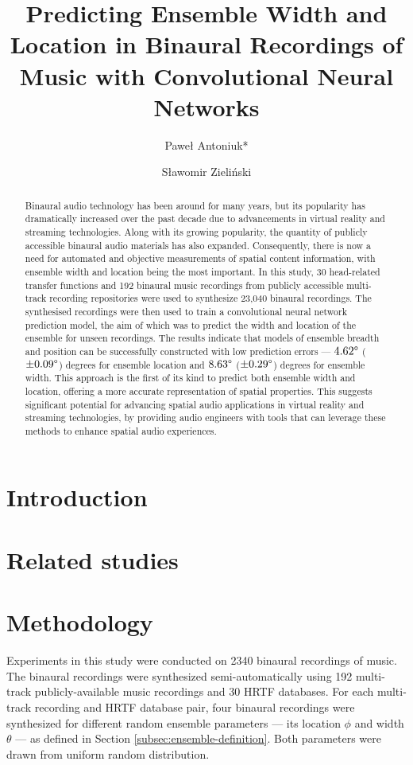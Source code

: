 \documentclass{article}
\title{Predicting Ensemble Width and Location in Binaural Recordings of Music with Convolutional Neural Networks}
\author[1]{Paweł Antoniuk*}
\author[1]{Sławomir Zieliński}
\affil[1]{Faculty of Computer Science, Białystok University of Technology, 15-351 Białystok, Poland; pawel.antoniuk@sd.pb.edu.pl}
\affil[*]{Corresponding author: pawel.antoniuk@sd.pb.edu.pl}
\date{}
\begin{document}
\maketitle

\begin{abstract}
Binaural audio technology has been around for many years, but its popularity has dramatically increased over the past decade due to advancements in virtual reality and streaming technologies. Along with its growing popularity, the quantity of publicly accessible binaural audio materials has also expanded. Consequently, there is now a need for automated and objective measurements of spatial content information, with ensemble width and location being the most important. In this study, 30 head-related transfer functions and 192 binaural music recordings from publicly accessible multi-track recording repositories were used to synthesize 23,040 binaural recordings. The synthesised recordings were then used to train a convolutional neural network prediction model, the aim of which was to predict the width and location of the ensemble for unseen recordings. The results indicate that models of ensemble breadth and position can be successfully constructed with low prediction errors --- $4.62\degree$ ($\pm0.09\degree$) degrees for ensemble location and $8.63\degree$ ($\pm0.29\degree$) degrees for ensemble width. This approach is the first of its kind to predict both ensemble width and location, offering a more accurate representation of spatial properties. This suggests significant potential for advancing spatial audio applications in virtual reality and streaming technologies, by providing audio engineers with tools that can leverage these methods to enhance spatial audio experiences.
\end{abstract}


\section{Introduction}
\section{Related studies}



\section{Methodology}

Experiments in this study were conducted on 2340 binaural recordings of music. The binaural recordings were synthesized semi-automatically using 192 multi-track publicly-available music recordings and 30 HRTF databases. For each multi-track recording and HRTF database pair, four binaural recordings were synthesized for different random ensemble parameters --- its location $\phi$ and width $\theta$ --- as defined in Section \ref{subsec:ensemble-definition}. Both parameters were drawn from uniform random distribution.
\end{document}
